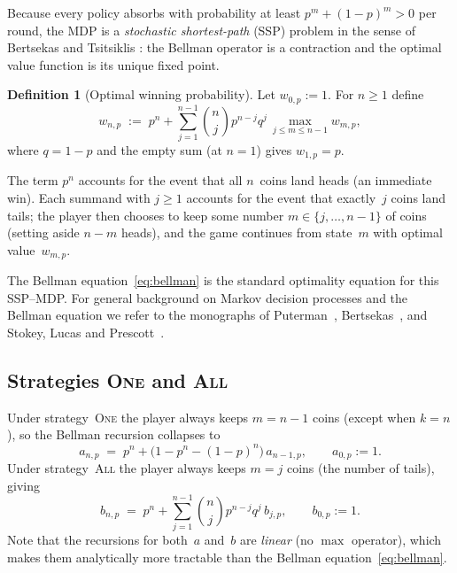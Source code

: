 \documentclass[12pt]{article}
\theoremstyle{definition}
\newtheorem{definition}[theorem]{Definition}
\theoremstyle{remark}
\newcommand{\One}{\textsc{One}}
\newcommand{\All}{\textsc{All}}
\begin{document}
Because every policy absorbs with probability at least
$p^m+(1-p)^m>0$ per round, the MDP is a \emph{stochastic
shortest-path} (SSP) problem in the sense of Bertsekas and Tsitsiklis
\cite{BertsekisTsitsiklis1991}: the Bellman operator is a contraction
and the optimal value function is its unique fixed point.

\begin{definition}[Optimal winning probability]\label{def:w}
  Let $w_{0,p}:=1$.  For $n\ge 1$ define
  \begin{equation}\label{eq:bellman}
    w_{n,p} \;:=\; p^n + \sum_{j=1}^{n-1}\binom{n}{j}p^{n-j}q^{j}\,
    \max_{j\le m\le n-1} w_{m,p},
  \end{equation}
  where $q=1-p$ and the empty sum (at $n=1$) gives
  $w_{1,p}=p$.
\end{definition}

The term $p^n$ accounts for the event that all $n$~coins land heads
(an immediate win).  Each summand with $j\ge 1$ accounts for the
event that exactly~$j$ coins land tails; the player then chooses to
keep some number $m\in\{j,\dots,n-1\}$ of coins (setting aside
$n-m$ heads), and the game continues from state~$m$ with optimal
value~$w_{m,p}$.

The Bellman equation~\eqref{eq:bellman} is the standard optimality
equation for this SSP--MDP.  For general background on Markov decision
processes and the Bellman equation we refer to the monographs of
Puterman~\cite{Puterman1994}, Bertsekas~\cite{Bertsekas2017}, and
Stokey, Lucas and Prescott~\cite{StokeyLucas1989}.

\subsection{Strategies \One{} and \All}

Under strategy~\One{} the player always keeps $m=n-1$ coins
(except when $k=n$), so the Bellman recursion collapses to
\begin{equation}\label{eq:a-rec}
  a_{n,p} \;=\; p^n + \bigl(1-p^n-(1-p)^n\bigr)\,a_{n-1,p},
  \qquad a_{0,p}:=1.
\end{equation}
Under strategy~\All{} the player always keeps $m=j$ coins (the
number of tails), giving
\begin{equation}\label{eq:b-rec}
  b_{n,p} \;=\; p^n + \sum_{j=1}^{n-1}\binom{n}{j}p^{n-j}q^{j}\,
  b_{j,p},
  \qquad b_{0,p}:=1.
\end{equation}
Note that the recursions for both~$a$ and~$b$ are \emph{linear}
(no $\max$ operator), which makes them analytically more tractable
than the Bellman equation~\eqref{eq:bellman}.
\end{document}
